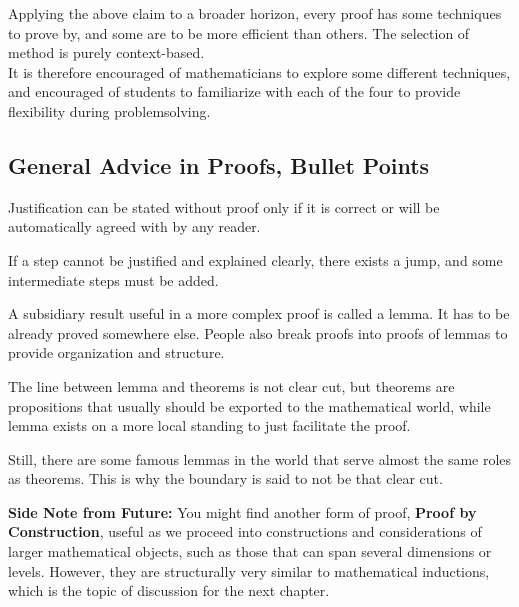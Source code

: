 Applying the above claim to a broader horizon, every proof has some techniques to prove by, and some are to be more efficient than others. The selection of method is purely context-based. \\
It is therefore encouraged of mathematicians to explore some different techniques, and encouraged of students to familiarize with each of the four to provide flexibility during problemsolving.

\subsection{General Advice in Proofs, Bullet Points}
\begin{bindenum}
    \item Justification can be stated without proof only if it is correct or will be automatically agreed with by any reader.
    \item If a step cannot be justified and explained clearly, there exists a jump, and some intermediate steps must be added.
    \item A subsidiary result useful in a more complex proof is called a lemma. It has to be already proved somewhere else. People also break proofs into proofs of lemmas to provide organization and structure.
    \item The line between lemma and theorems is not clear cut, but theorems are propositions that usually should be exported to the mathematical world, while lemma exists on a more local standing to just facilitate the proof.
    \item Still, there are some famous lemmas in the world that serve almost the same roles as theorems. This is why the boundary is said to not be that clear cut.
\end{bindenum}

\textbf{Side Note from Future:} You might find another form of proof, \textbf{Proof by Construction}, useful as we proceed into constructions and considerations of larger mathematical objects, such as those that can span several dimensions or levels. 
However, they are structurally very similar to mathematical inductions, which is the topic of discussion for the next chapter.

